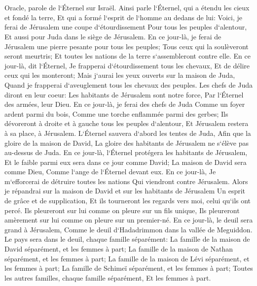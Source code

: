 \chapter{}

\verse Oracle, parole de l`Éternel sur Israël. Ainsi parle l`Éternel, qui a étendu les cieux et fondé la terre, Et qui a formé l`esprit de l`homme au dedans de lui: 
\verse Voici, je ferai de Jérusalem une coupe d`étourdissement Pour tous les peuples d`alentour, Et aussi pour Juda dans le siège de Jérusalem. 
\verse En ce jour-là, je ferai de Jérusalem une pierre pesante pour tous les peuples; Tous ceux qui la soulèveront seront meurtris; Et toutes les nations de la terre s`assembleront contre elle. 
\verse En ce jour-là, dit l`Éternel, Je frapperai d`étourdissement tous les chevaux, Et de délire ceux qui les monteront; Mais j`aurai les yeux ouverts sur la maison de Juda, Quand je frapperai d`aveuglement tous les chevaux des peuples. 
\verse Les chefs de Juda diront en leur coeur: Les habitants de Jérusalem sont notre force, Par l`Éternel des armées, leur Dieu. 
\verse En ce jour-là, je ferai des chefs de Juda Comme un foyer ardent parmi du bois, Comme une torche enflammée parmi des gerbes; Ils dévoreront à droite et à gauche tous les peuples d`alentour, Et Jérusalem restera à sa place, à Jérusalem. 
\verse L`Éternel sauvera d`abord les tentes de Juda, Afin que la gloire de la maison de David, La gloire des habitants de Jérusalem ne s`élève pas au-dessus de Juda. 
\verse En ce jour-là, l`Éternel protégera les habitants de Jérusalem, Et le faible parmi eux sera dans ce jour comme David; La maison de David sera comme Dieu, Comme l`ange de l`Éternel devant eux. 
\verse En ce jour-là, Je m`efforcerai de détruire toutes les nations Qui viendront contre Jérusalem. 
\verse Alors je répandrai sur la maison de David et sur les habitants de Jérusalem Un esprit de grâce et de supplication, Et ils tourneront les regards vers moi, celui qu`ils ont percé. Ils pleureront sur lui comme on pleure sur un fils unique, Ils pleureront amèrement sur lui comme on pleure sur un premier-né. 
\verse En ce jour-là, le deuil sera grand à Jérusalem, Comme le deuil d`Hadadrimmon dans la vallée de Meguiddon. 
\verse Le pays sera dans le deuil, chaque famille séparément: La famille de la maison de David séparément, et les femmes à part; La famille de la maison de Nathan séparément, et les femmes à part; 
\verse La famille de la maison de Lévi séparément, et les femmes à part; La famille de Schimeï séparément, et les femmes à part; 
\verse Toutes les autres familles, chaque famille séparément, Et les femmes à part. 

